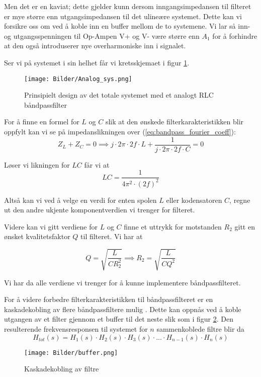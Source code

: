 Men det er en kaviat; dette gjelder kunn dersom inngangsimpedansen til filteret er mye større enn utgangsimpedansen til det ulineære systemet.
Dette kan vi forsikre oss om ved å koble inn en buffer mellom de to systemene.
Vi lar så inn- og utgangsspenningen til Op-Ampen V+ og V- være større enn $A_1$ for å 
forhindre at den også introduserer nye overharmoniske inn i signalet.

Ser vi på systemet i sin helhet får vi kretsskjemaet i figur \ref{fig:anal_rlc_sys}.
\begin{figure}[H]
    \centering
    \texttt{[image: Bilder/Analog\_sys.png]}
    \caption{Prinsipielt design av det totale systemet med et analogt RLC båndpassfilter}
    \label{fig:anal_rlc_sys}
\end{figure}

For å finne en formel for $L$ og $C$ slik at den ønskede filterkarakteristikken blir oppfylt kan vi se på 
impedanslikningen over (\ref{eq:bandpass_fourier_coeff}):
\[
    Z_L + Z_C = 0 \implies j \cdot 2\pi \cdot 2f \cdot L + \frac{1}{j \cdot 2\pi \cdot 2f \cdot C} = 0
\]

Løser vi likningen for $LC$ får vi at 
\[
    LC = \frac{1}{4\pi^2 \cdot (2f)^2}
\]

Altså kan vi ved å velge en verdi for enten spolen $L$ eller kodensatoren $C$, regne ut 
den andre ukjente komponentverdien vi trenger for filteret.

Videre kan vi gitt verdiene for $L$ og $C$ finne et uttrykk for motstanden $R_2$ gitt en ønsket 
kvalitetsfaktor $Q$ til filteret. Vi har at 

\[
    Q = \sqrt{\frac{L}{C R_2^2}} \implies R_2 = \sqrt{\frac{L}{C Q^2}}
\]

Vi har da alle verdiene vi trenger for å kunne implementere båndpassfilteret.

For å videre forbedre filterkarakteristikken til båndpassfilteret er en kaskadekobling av flere båndpassfiltere mulig \cite{design3}.
Dette kan oppnås ved å koble utgangen av et filter gjennom et buffer til det neste slik som i figur \ref{fig:cascade}. Den resulterende frekvensresponsen til 
systemet for $n$ sammenkoblede filtre blir da 
\[
    H_{tot}(s) = H_1(s) \cdot H_2(s) \cdot H_3(s) \cdot ... \cdot H_{n-1}(s) \cdot H_n(s)
\]

\begin{figure}[H]
    \centering
    \texttt{[image: Bilder/buffer.png]}
    \caption{Kaskadekobling av filtre \cite{design3}}
    \label{fig:cascade}
\end{figure}

